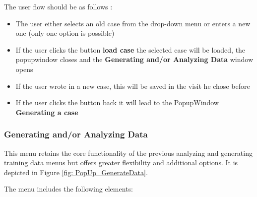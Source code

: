 \documentclass[]{scrreprt}
\begin{document}
The user flow should be as follows : \\
\begin{itemize}
    \item The user either selects an old case from the drop-down menu or enters a new one (only one option is possible)
    \item If the user clicks the button \textbf{load case} the selected case will be loaded, the popupwindow closes and the \textbf{Generating and/or Analyzing Data} window opens
    \item If the user wrote in a new case, this will be saved in the visit he chose before
    \item If the user clicks the button back it will lead to the PopupWindow \textbf{Generating a case}
\end{itemize}


\subsubsection{Generating and/or Analyzing Data}


This menu retains the core functionality of the previous analyzing and generating training data menus but offers greater flexibility and additional options. It is depicted in Figure \ref{fig: PopUp_GenerateData}.


The menu includes the following elements:
\end{document}
